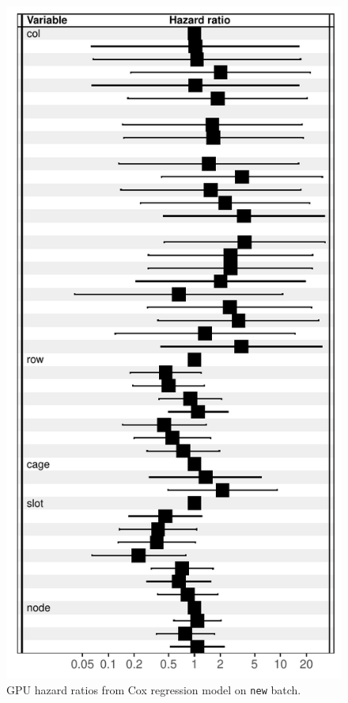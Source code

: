 \begin{figure}
  \includegraphics[width=\columnwidth]{figs/cox_n001.pdf}
  \caption{GPU hazard ratios from Cox regression model on {\tt new}
    batch.}
\end{figure}

